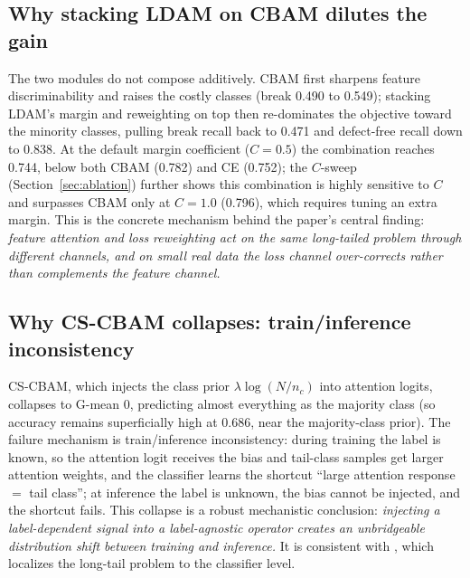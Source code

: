 \documentclass[a4paper,fleqn]{cas-sc}
\begin{document}
\begin{sloppypar}
	\subsection{Why stacking LDAM on CBAM dilutes the gain}
	\par{
		The two modules do not compose additively. CBAM first sharpens feature discriminability and raises the costly classes (break 0.490 to 0.549); stacking LDAM's margin and reweighting on top then re-dominates the objective toward the minority classes, pulling break recall back to 0.471 and defect-free recall down to 0.838. At the default margin coefficient ($C=0.5$) the combination reaches 0.744, below both CBAM (0.782) and CE (0.752); the $C$-sweep (Section~\ref{sec:ablation}) further shows this combination is highly sensitive to $C$ and surpasses CBAM only at $C=1.0$ (0.796), which requires tuning an extra margin. This is the concrete mechanism behind the paper's central finding: \emph{feature attention and loss reweighting act on the same long-tailed problem through different channels, and on small real data the loss channel over-corrects rather than complements the feature channel.}
	}

	\subsection{Why CS-CBAM collapses: train/inference inconsistency}
	\par{
		CS-CBAM, which injects the class prior $\lambda\log(N/n_c)$ into attention logits, collapses to G-mean 0, predicting almost everything as the majority class (so accuracy remains superficially high at 0.686, near the majority-class prior). The failure mechanism is train/inference inconsistency: during training the label is known, so the attention logit receives the bias and tail-class samples get larger attention weights, and the classifier learns the shortcut ``large attention response $=$ tail class''; at inference the label is unknown, the bias cannot be injected, and the shortcut fails. This collapse is a robust mechanistic conclusion: \emph{injecting a label-dependent signal into a label-agnostic operator creates an unbridgeable distribution shift between training and inference.} It is consistent with \citep{kang2020decoupling}, which localizes the long-tail problem to the classifier level.
	}


\end{sloppypar}
\end{document}
